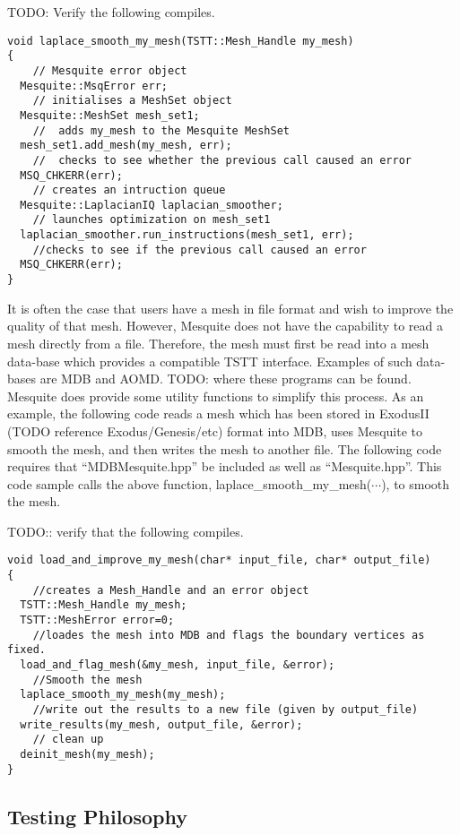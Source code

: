 TODO: Verify the following compiles.

\begin{verbatim}
void laplace_smooth_my_mesh(TSTT::Mesh_Handle my_mesh)
{     
    // Mesquite error object
  Mesquite::MsqError err;
    // initialises a MeshSet object
  Mesquite::MeshSet mesh_set1;
    //  adds my_mesh to the Mesquite MeshSet
  mesh_set1.add_mesh(my_mesh, err);
    //  checks to see whether the previous call caused an error
  MSQ_CHKERR(err);
    // creates an intruction queue
  Mesquite::LaplacianIQ laplacian_smoother;
    // launches optimization on mesh_set1
  laplacian_smoother.run_instructions(mesh_set1, err);
    //checks to see if the previous call caused an error
  MSQ_CHKERR(err);
}
\end{verbatim}

It is often the case that users have a mesh in file format and wish
to improve the quality of that mesh.  However, Mesquite does not have
the capability to read a mesh directly from a file.  Therefore, the mesh
must first be read into a mesh data-base which provides a compatible TSTT
interface.  Examples of such data-bases are MDB and AOMD.  TODO:
where these programs can be found.  Mesquite does provide some utility
functions to simplify this process.  As an example, the following
code reads a mesh which has been stored in ExodusII (TODO reference
Exodus/Genesis/etc) format into MDB, uses Mesquite to smooth the mesh,
and then writes the mesh to another file.  The following code requires
that ``MDBMesquite.hpp'' be included as well as ``Mesquite.hpp''.  This
code sample calls the above function, laplace\_smooth\_my\_mesh($\cdots$),
to smooth the mesh.

TODO:: verify that the following compiles.

\begin{verbatim}
void load_and_improve_my_mesh(char* input_file, char* output_file)
{
    //creates a Mesh_Handle and an error object
  TSTT::Mesh_Handle my_mesh;
  TSTT::MeshError error=0;
    //loades the mesh into MDB and flags the boundary vertices as fixed.
  load_and_flag_mesh(&my_mesh, input_file, &error);  
    //Smooth the mesh
  laplace_smooth_my_mesh(my_mesh);
    //write out the results to a new file (given by output_file)
  write_results(my_mesh, output_file, &error);
    // clean up
  deinit_mesh(my_mesh);
}
\end{verbatim}
\subsection{Testing Philosophy}

